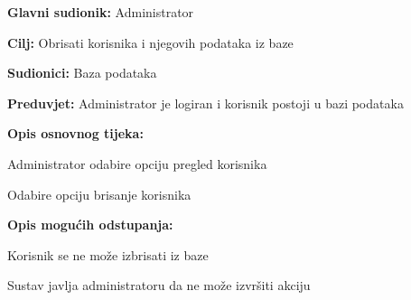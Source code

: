 				\noindent {}
				\begin{packed_item}
					
					\item \textbf{Glavni sudionik: }Administrator
					\item  \textbf{Cilj:} Obrisati korisnika i njegovih podataka iz baze
					\item  \textbf{Sudionici:} Baza podataka
					\item  \textbf{Preduvjet:} Administrator je logiran i korisnik postoji u bazi podataka
					\item  \textbf{Opis osnovnog tijeka:}
					
					\item[] \begin{packed_enum}
						\item Administrator odabire opciju pregled korisnika
						\item Odabire opciju brisanje korisnika
					\end{packed_enum}
					
					\item  \textbf{Opis mogućih odstupanja:}
					\item[] \begin{packed_item}
						
						\item[2.a] Korisnik se ne može izbrisati iz baze
						\item[] \begin{packed_enum}
							
							\item Sustav javlja administratoru da ne može izvršiti akciju						
						\end{packed_enum}
						
					\end{packed_item}
					
				\end{packed_item}
				
